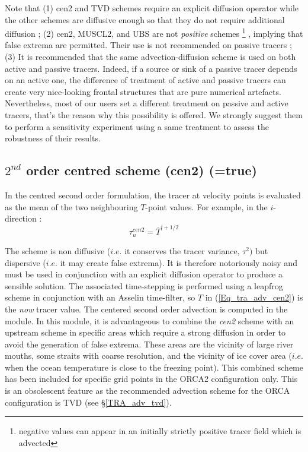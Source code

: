 \documentclass[NEMO_book]{subfiles}
\begin{document}
Note that 
(1) cen2 and TVD schemes require an explicit diffusion 
operator while the other schemes are diffusive enough so that they do not 
require additional diffusion ; 
(2) cen2, MUSCL2, and UBS are not \textit{positive} schemes
\footnote{negative values can appear in an initially strictly positive tracer field 
which is advected}
, implying that false extrema are permitted. Their use is not recommended on passive tracers ; 
(3) It is recommended that the same advection-diffusion scheme is 
used on both active and passive tracers. Indeed, if a source or sink of a 
passive tracer depends on an active one, the difference of treatment of 
active and passive tracers can create very nice-looking frontal structures 
that are pure numerical artefacts. Nevertheless, most of our users set a different 
treatment on passive and active tracers, that's the reason why this possibility 
is offered. We strongly suggest them to perform a sensitivity experiment 
using a same treatment to assess the robustness of their results.

\subsection   [$2^{nd}$ order centred scheme (cen2) (\np{ln\_traadv\_cen2})]
			{$2^{nd}$ order centred scheme (cen2) (=true)}
\label{TRA_adv_cen2}

In the centred second order formulation, the tracer at velocity points is 
evaluated as the mean of the two neighbouring $T$-point values. 
For example, in the $i$-direction :
\begin{equation} \label{Eq_tra_adv_cen2}
\tau _u^{cen2} =\overline T ^{i+1/2}
\end{equation}

The scheme is non diffusive ($i.e.$ it conserves the tracer variance, $\tau^2)$ 
but dispersive ($i.e.$ it may create false extrema). It is therefore notoriously 
noisy and must be used in conjunction with an explicit diffusion operator to 
produce a sensible solution. The associated time-stepping is performed using 
a leapfrog scheme in conjunction with an Asselin time-filter, so $T$ in 
(\ref{Eq_tra_adv_cen2}) is the \textit{now} tracer value. The centered second 
order advection is computed in the  module. In this module,
it is advantageous to combine the \textit{cen2} scheme with an upstream scheme
in specific areas which require a strong diffusion in order to avoid the generation 
of false extrema. These areas are the vicinity of large river mouths, some straits 
with coarse resolution, and the vicinity of ice cover area ($i.e.$ when the ocean 
temperature is close to the freezing point).
This combined scheme has been included for specific grid points in the ORCA2 
configuration only. This is an obsolescent feature as the recommended 
advection scheme for the ORCA configuration is TVD (see  \S\ref{TRA_adv_tvd}).
\end{document}
